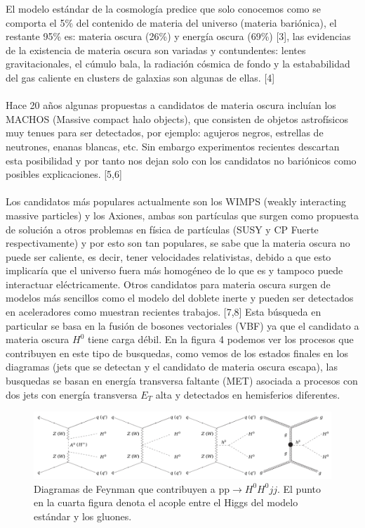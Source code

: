 El modelo estándar de la cosmología predice que solo conocemos como se comporta el 5\% del contenido de materia del universo (materia bariónica), el restante 95\% es: materia oscura (26\%) y energía oscura (69\%) [3], las evidencias de la existencia de materia oscura son variadas y contundentes: lentes gravitacionales, el cúmulo bala, la radiación cósmica de fondo y la estababilidad del gas caliente en clusters de galaxias son algunas de ellas. [4] 
\\
\\
Hace 20 años algunas propuestas a candidatos de materia oscura incluían los MACHOS (Massive compact halo objects), que consisten de objetos astrofísicos muy tenues para ser detectados, por ejemplo: agujeros negros, estrellas de neutrones, enanas blancas, etc. Sin embargo experimentos recientes descartan esta posibilidad y por tanto nos dejan solo con los candidatos no bariónicos como posibles explicaciones. [5,6]
\\
\\
Los candidatos más populares actualmente son los WIMPS (weakly interacting massive particles) y los Axiones, ambas son partículas que surgen como propuesta de solución a otros problemas en física de partículas (SUSY y CP Fuerte respectivamente) y por esto son tan populares, se sabe que la materia oscura no puede ser caliente, es decir, tener velocidades relativistas, debido a que esto implicaría que el universo fuera más homogéneo de lo que es y tampoco puede interactuar eléctricamente. Otros candidatos para materia oscura surgen de modelos más sencillos como el modelo del doblete inerte y pueden ser detectados en aceleradores como muestran recientes trabajos. [7,8] Esta búsqueda en particular se basa en la fusión de bosones vectoriales (VBF) ya que el candidato a materia oscura $H^0$ tiene carga débil. En la figura 4 podemos ver los procesos que contribuyen en este tipo de busquedas, como vemos de los estados finales en los diagramas (jets que se detectan y el candidato de materia oscura escapa), las busquedas se basan en energía transversa faltante (MET) asociada a procesos con dos jets con energía transversa $E_T$ alta y detectados en hemisferios diferentes.
\begin{figure}
	\centering
	\includegraphics[width=15cm]{F4.png}
	\caption{\label{fig:frog} Diagramas de Feynman que contribuyen a pp$\rightarrow H^0H^0 jj$. El punto en la cuarta figura denota el acople entre el Higgs del modelo estándar y los gluones.}
\end{figure}
